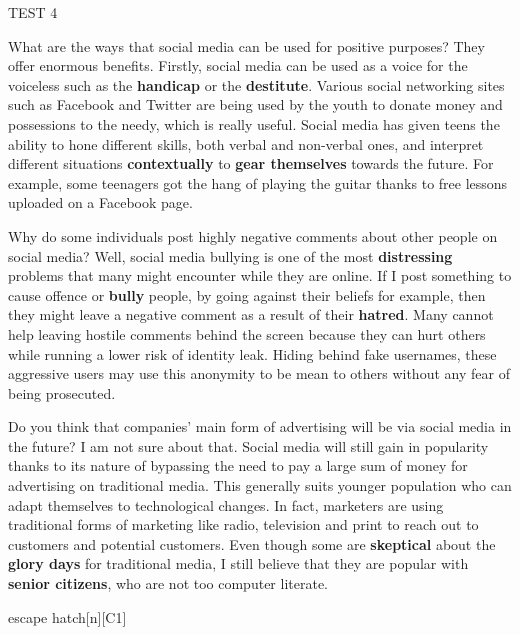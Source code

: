 \begin{glossarymc}[Cambridge 13]
\begin{test}{TEST 4}
    \begin{qa}{What are the ways that social media can be used for positive purposes?}
    They offer enormous benefits. Firstly, social media can be used as a voice for the voiceless such as the \textbf{handicap} or the \textbf{destitute}. Various social networking sites such as Facebook and Twitter are being used by the youth to donate money and possessions to the needy, which is really useful. Social media has given teens the ability to hone different skills, both verbal and non-verbal ones, and interpret different situations \textbf{contextually} to \textbf{gear themselves} towards the future. For example, some teenagers got the hang of playing the guitar thanks to free lessons uploaded on a Facebook page.
    \end{qa}

    \begin{qa}{Why do some individuals post highly negative comments about other people on social media?}
    Well, social media bullying is one of the most \textbf{distressing} problems that many might encounter while they are online. If I post something to cause offence or \textbf{bully} people, by going against their beliefs for example, then they might leave a negative comment as a result of their \textbf{hatred}. Many cannot help leaving hostile comments behind the screen because they can hurt others while running a lower risk of identity leak. Hiding behind fake usernames, these aggressive users may use this anonymity to be mean to others without any fear of being prosecuted.
    \end{qa}

    \begin{qa}{Do you think that companies’ main form of advertising will be via social media in the future?}
    I am not sure about that. Social media will still gain in popularity thanks to its nature of bypassing the need to pay a large sum of money for advertising on traditional media. This generally suits younger population who can adapt themselves to technological changes. In fact, marketers are using traditional forms of marketing like radio, television and print to reach out to customers and potential customers. Even though some are \textbf{skeptical} about the \textbf{glory days} for traditional media, I still believe that they are popular with \textbf{senior citizens}, who are not too computer literate.
    \end{qa}

        \begin{VocabExplain}[Part 3]
            \begin{ExplainCard}{escape hatch}[n][C1]
            \end{ExplainCard}


\end{VocabExplain}
\end{test}
\end{glossarymc}
